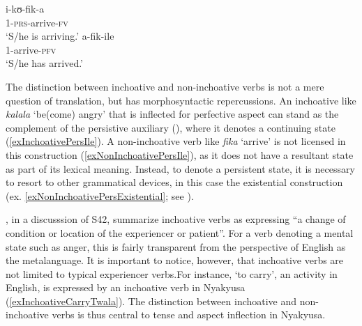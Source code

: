 \begin{exe}
\ex \label{exNonInchoativePRS}\gll i-kʊ-fik-a\\
1-\textsc{prs}-arrive-\textsc{fv}\\
\glt `S/he is arriving.'
\ex \label{exNonInchoativePFV} \gll a-fik-ile\\
1-arrive-\textsc{pfv}\\
\glt `S/he has arrived.'
\end{exe}

The distinction between inchoative and non-inchoative verbs is not a mere question of translation, but has morphosyntactic repercussions. An inchoative like \textit{kalala} `be(come) angry' that is inflected for perfective aspect can stand as the complement of the persistive auxiliary (), where it denotes a continuing state (\ref{exInchoativePersIle}). A non-inchoative verb like \textit{fika} `arrive' is not licensed in this construction (\ref{exNonInchoativePersIle}), as it does not have a resultant state as part of its lexical meaning. Instead, to denote a persistent state, it is necessary to resort to other grammatical devices, in this case the existential construction (ex. \ref{exNonInchoativePersExistential}; see ).

\begin{exe}
\label{exInchoativePersIle}
\end{exe}

\citet[165]{BotneRKershnerT2000}, in a discusssion of  S42, summarize inchoative verbs as expressing ``a change of condition or location of the experiencer or patient''. For a verb denoting a mental state such as anger, this is fairly transparent from the perspective of English as the metalanguage. It is important to notice, however, that inchoative verbs are not limited to typical experiencer verbs.For instance, `to carry', an activity in English, is expressed by an inchoative verb in Nyakyusa (\ref{exInchoativeCarryTwala}). The distinction between inchoative and non-inchoative verbs is thus central to tense and aspect inflection in Nyakyusa.

